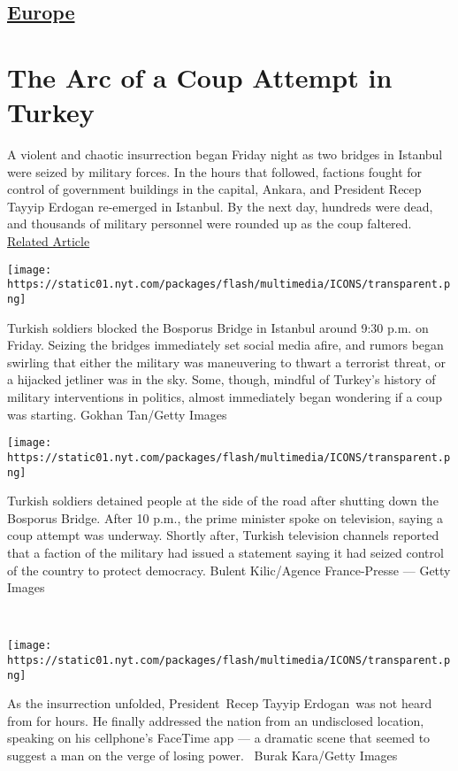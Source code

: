 \hypertarget{-europe-}{%
\subsection{\texorpdfstring{ \href{/section/world/europe}{Europe}
}{ Europe }}\label{-europe-}}

\hypertarget{the-arc-of-a-coup-attempt-in-turkey}{%
\section{The Arc of a Coup Attempt in
Turkey}\label{the-arc-of-a-coup-attempt-in-turkey}}

A violent and chaotic insurrection began Friday night as two bridges in
Istanbul were seized by military forces. In the hours that followed,
factions fought for control of government buildings in the capital,
Ankara, and President Recep Tayyip Erdogan re-emerged in Istanbul. By
the next day, hundreds were dead, and thousands of military personnel
were rounded up as the coup faltered.
\href{https://www.nytimes.com/2016/07/17/world/europe/turkey-attempted-coup-erdogan.html}{Related
Article}

\texttt{[image: https://static01.nyt.com/packages/flash/multimedia/ICONS/transparent.png]}

Turkish soldiers blocked the Bosporus Bridge in Istanbul around 9:30
p.m. on Friday. Seizing the bridges immediately set social media afire,
and rumors began swirling that either the military was maneuvering to
thwart a terrorist threat, or a hijacked jetliner was in the sky. Some,
though, mindful of Turkey's history of military interventions in
politics, almost immediately began wondering if a coup was starting.
Gokhan Tan/Getty Images

\texttt{[image: https://static01.nyt.com/packages/flash/multimedia/ICONS/transparent.png]}

Turkish soldiers detained people at the side of the road after shutting
down the Bosporus Bridge. After 10 p.m., the prime minister spoke on
television, saying a coup attempt was underway. Shortly after, Turkish
television channels reported that a faction of the military had issued a
statement saying it had seized control of the country to protect
democracy. Bulent Kilic/Agence France-Presse --- Getty Images

~

\texttt{[image: https://static01.nyt.com/packages/flash/multimedia/ICONS/transparent.png]}

As the insurrection unfolded, President~Recep Tayyip Erdogan~was not
heard from for hours. He finally addressed the nation from an
undisclosed location, speaking on his cellphone's FaceTime app --- a
dramatic scene that seemed to suggest a man on the verge of losing
power.~ Burak Kara/Getty Images

